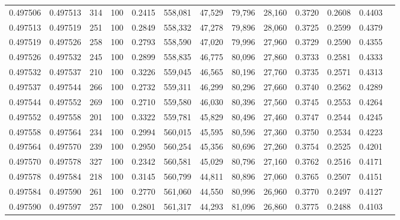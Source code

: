 \begin{tabular}{rrrrrrrrrrrrr}
0.497506 & 0.497513 &   314 & 100 &                                     0.2415 & 558,081 &  47,529 &  79,796 &  28,160 & 0.3720 & 0.2608 & 0.4403 \\
0.497513 & 0.497519 &   251 & 100 &                                     0.2849 & 558,332 &  47,278 &  79,896 &  28,060 & 0.3725 & 0.2599 & 0.4379 \\
0.497519 & 0.497526 &   258 & 100 &                                     0.2793 & 558,590 &  47,020 &  79,996 &  27,960 & 0.3729 & 0.2590 & 0.4355 \\
0.497526 & 0.497532 &   245 & 100 &                                     0.2899 & 558,835 &  46,775 &  80,096 &  27,860 & 0.3733 & 0.2581 & 0.4333 \\
0.497532 & 0.497537 &   210 & 100 &                                     0.3226 & 559,045 &  46,565 &  80,196 &  27,760 & 0.3735 & 0.2571 & 0.4313 \\
0.497537 & 0.497544 &   266 & 100 &                                     0.2732 & 559,311 &  46,299 &  80,296 &  27,660 & 0.3740 & 0.2562 & 0.4289 \\
0.497544 & 0.497552 &   269 & 100 &                                     0.2710 & 559,580 &  46,030 &  80,396 &  27,560 & 0.3745 & 0.2553 & 0.4264 \\
0.497552 & 0.497558 &   201 & 100 &                                     0.3322 & 559,781 &  45,829 &  80,496 &  27,460 & 0.3747 & 0.2544 & 0.4245 \\
0.497558 & 0.497564 &   234 & 100 &                                     0.2994 & 560,015 &  45,595 &  80,596 &  27,360 & 0.3750 & 0.2534 & 0.4223 \\
0.497564 & 0.497570 &   239 & 100 &                                     0.2950 & 560,254 &  45,356 &  80,696 &  27,260 & 0.3754 & 0.2525 & 0.4201 \\
0.497570 & 0.497578 &   327 & 100 &                                     0.2342 & 560,581 &  45,029 &  80,796 &  27,160 & 0.3762 & 0.2516 & 0.4171 \\
0.497578 & 0.497584 &   218 & 100 &                                     0.3145 & 560,799 &  44,811 &  80,896 &  27,060 & 0.3765 & 0.2507 & 0.4151 \\
0.497584 & 0.497590 &   261 & 100 &                                     0.2770 & 561,060 &  44,550 &  80,996 &  26,960 & 0.3770 & 0.2497 & 0.4127 \\
0.497590 & 0.497597 &   257 & 100 &                                     0.2801 & 561,317 &  44,293 &  81,096 &  26,860 & 0.3775 & 0.2488 & 0.4103 \\

\end{tabular}
